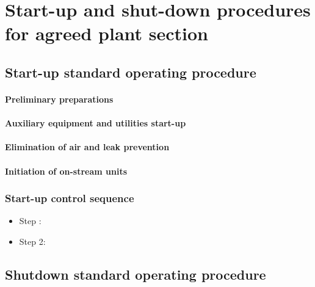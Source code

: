\section{Start-up and shut-down procedures for agreed plant section}

\subsection{Start-up standard operating procedure}

\paragraph{Preliminary preparations}

\paragraph{Auxiliary equipment and utilities start-up}

\paragraph{Elimination of air and leak prevention}

\paragraph{Initiation of on-stream units}



\subsubsection{Start-up control sequence}


\begin{itemize}
    \item Step :
    \item Step 2: 
\end{itemize}


\subsection{Shutdown standard operating procedure}